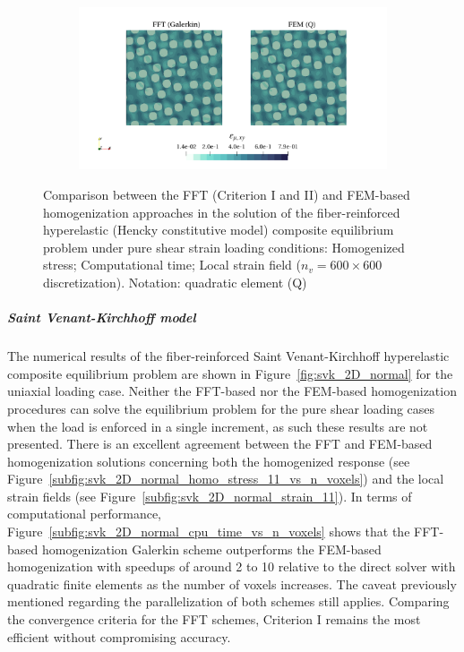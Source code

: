 \begin{figure}[hbt]
\begin{subfigure}[b]{0.49\textwidth}
    \caption{}
    \label{subfig:hencky_2D_shear_cpu_time_vs_n_voxels}
  \end{subfigure}
  \begin{subfigure}[b]{\textwidth}
    \centering
    \includegraphics[width=\textwidth]{figures/hencky_2D_shear_strain_12}
    \caption{}
    \label{subfig:hencky_2D_shear_strain_12}
  \end{subfigure}
  \caption{Comparison between the FFT (Criterion I and II) and FEM-based homogenization approaches in the
  solution of the fiber-reinforced hyperelastic (Hencky constitutive model) composite equilibrium problem under pure
  shear strain loading conditions:
   Homogenized stress;
   Computational time;
   Local strain field (\(n_v = 600 \times 600\)
  discretization). Notation: quadratic element (Q)}
\label{fig:hencky_2D_shear}
\end{figure}

\FloatBarrier

\subparagraph{Saint Venant-Kirchhoff model}

The numerical results of the fiber-reinforced Saint Venant-Kirchhoff hyperelastic composite equilibrium problem are shown in Figure~\ref{fig:svk_2D_normal} for the uniaxial loading case.
Neither the FFT-based nor the FEM-based homogenization procedures can solve the equilibrium problem for the pure shear loading cases when the load is enforced in a single increment, as such these results are not presented.
There is an excellent agreement between the FFT and FEM-based homogenization solutions concerning both the homogenized response (see Figure~\ref{subfig:svk_2D_normal_homo_stress_11_vs_n_voxels}) and the local strain fields (see Figure~\ref{subfig:svk_2D_normal_strain_11}).
In terms of computational performance, Figure~\ref{subfig:svk_2D_normal_cpu_time_vs_n_voxels} shows that the FFT-based homogenization Galerkin scheme outperforms the FEM-based homogenization with speedups of around 2 to 10 relative to the direct solver with quadratic finite elements as the number of voxels increases.
The caveat previously mentioned regarding the parallelization of both schemes still applies.
Comparing the convergence criteria for the FFT schemes, Criterion I remains the most efficient without compromising accuracy.

